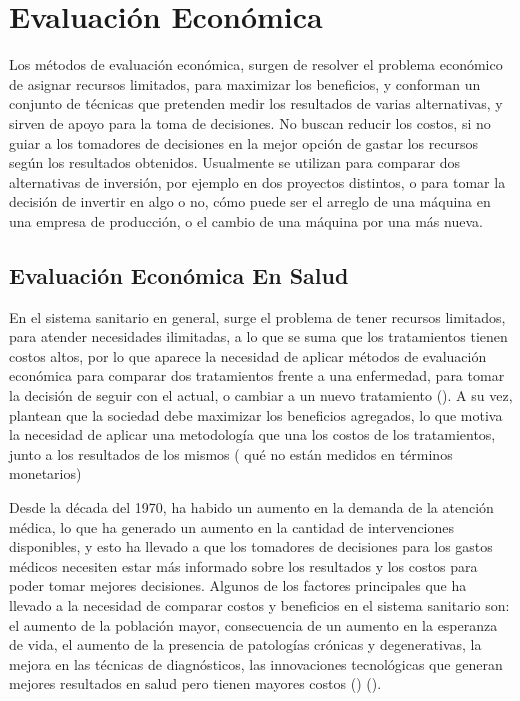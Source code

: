 \documentclass{siep}
\begin{document}
\section{Evaluación Económica}
\label{sec:EE}

Los métodos de evaluación económica, surgen de resolver el problema económico de asignar recursos limitados, para maximizar los beneficios,  y conforman un conjunto de técnicas que pretenden medir los resultados de varias alternativas, y sirven de apoyo para la toma de decisiones. No buscan reducir los costos, si no guiar a los tomadores de decisiones en la mejor opción de gastar los recursos según los resultados obtenidos.
Usualmente se utilizan para comparar dos alternativas de inversión, por ejemplo en dos proyectos distintos, o para tomar la decisión de invertir en algo o no, cómo puede ser el arreglo de una máquina en una empresa de producción, o el cambio de una máquina por una más nueva.

\subsection{Evaluación Económica En Salud}
\label{sec:EES}
En el sistema sanitario en general, surge el problema de tener recursos limitados, para atender necesidades ilimitadas,  a lo que se suma que los tratamientos tienen costos altos, por lo que aparece la necesidad de aplicar métodos de evaluación económica para comparar dos tratamientos frente a una enfermedad, para tomar la decisión de seguir con el actual, o cambiar a un nuevo tratamiento (\cite{moreno_bayesian_nodate}). A su vez, \cite{weinstein_foundations_1977} plantean que la sociedad debe maximizar los beneficios agregados, lo que motiva la necesidad de aplicar una metodología que una los costos de los tratamientos, junto a los resultados de los mismos ( qué no están medidos en términos monetarios)

Desde la década del 1970, ha habido un aumento en la demanda de la atención médica, lo que ha generado un aumento en la cantidad de intervenciones disponibles,  y esto ha llevado a que los tomadores de decisiones para los gastos médicos necesiten estar más informado sobre los resultados y los costos para poder tomar mejores decisiones. Algunos de los factores principales que ha llevado a la necesidad de comparar costos y beneficios en el sistema sanitario son: el aumento de la población mayor, consecuencia de un aumento en la esperanza de vida, el aumento de la presencia de patologías crónicas y degenerativas, la mejora en las técnicas de diagnósticos, las innovaciones tecnológicas que generan mejores resultados en salud pero tienen mayores costos (\cite{baio_bayesian_nodate}) (\cite{soto_alvarez_evaluacion_2012}).
\end{document}
